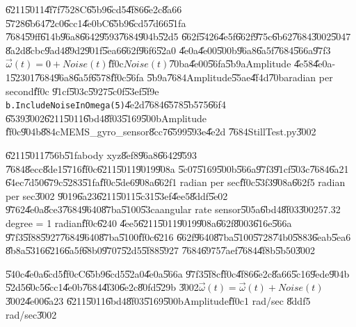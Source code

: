 \U{6211}\U{5011}\U{4f7f}\U{7528}C\U{65b9}\U{6cd5}\U{4f86}\U{6e2c}\U{8a66}%
\U{5728}\U{6b64}\U{72c0}\U{6cc1}\U{4e0b}C\U{65b9}\U{6cd5}\U{7d66}\U{51fa}%
\U{7684}\U{59ff}\U{614b}\U{96a8}\U{6642}\U{9593}\U{7684}\U{904b}\U{52d5}%
\U{662f}\U{5426}\U{4e5f}\U{662f}\U{975c}\U{6b62}\U{7684}\U{3002}\U{5047}%
\U{8a2d}\U{8cbc}\U{9ad4}\U{89d2}\U{901f}\U{5ea6}\U{662f}\U{96f6}\U{52a0}%
\U{4e0a}\U{4e00}\U{500b}\U{96a8}\U{6a5f}\U{7684}\U{566a}\U{97f3}$\vec{\omega}%
(t)=0+Noise(t)$\U{ff0c}$Noise(t)$\U{70ba}\U{4e00}\U{56fa}\U{5b9a}Amplitude%
\U{4e58}\U{4e0a}-1\U{5230}1\U{7684}\U{96a8}\U{6a5f}\U{6578}\U{ff0c}\U{56fa}%
\U{5b9a}\U{7684}Amplitude\U{55ae}\U{4f4d}\U{70ba}radian per second\U{ff0c}%
\U{91cf}\U{503c}\U{5927}\U{5c0f}\U{53ef}\U{5f9e}\newline
\texttt{b.IncludeNoiseInOmega(5)}\U{4e2d}\U{7684}\U{6578}\U{5b57}5\U{66f4}%
\U{6539}\U{3002}\U{6211}\U{5011}\U{6bd4}\U{8f03}\U{5169}\U{500b}Amplitude%
\U{ff0c}\U{904b}\U{884c}MEMS\_gyro\_sensor\U{8cc7}\U{6599}\U{593e}\U{4e2d}%
\U{7684}StillTest.py\U{3002}

\bigskip 

\U{6211}\U{5011}\U{756b}\U{51fa}body xyz\U{8ef8}\U{96a8}\U{6642}\U{9593}%
\U{7684}\U{8ecc}\U{8de1}\U{5716}\U{ff0c}\U{6211}\U{5011}\U{9019}\U{908a}%
\U{5c07}\U{5169}\U{500b}\U{566a}\U{97f3}\U{91cf}\U{503c}\U{7684}\U{6a21}%
\U{64ec}\U{7d50}\U{679c}\U{5283}\U{51fa}\U{ff0c}\U{5de6}\U{908a}\U{662f}1
radian per sec\U{ff0c}\U{53f3}\U{908a}\U{662f}5 radian per sec\U{3002}%
\U{9019}\U{6a23}\U{6211}\U{5011}\U{5c31}\U{53ef}\U{4ee5}\U{8ddf}\U{5e02}%
\U{9762}\U{4e0a}\U{8ce3}\U{7684}\U{9640}\U{87ba}\U{5100}\U{53ca}angular rate
sensor\U{505a}\U{6bd4}\U{8f03}\U{3002}57.32 degree = 1 radian\U{ff0c}\U{6240}%
\U{4ee5}\U{6211}\U{5011}\U{9019}\U{908a}\U{662f}\U{8003}\U{616e}\U{566a}%
\U{97f3}\U{5f88}\U{5927}\U{7684}\U{9640}\U{87ba}\U{5100}\U{ff0c}\U{6216}%
\U{662f}\U{9640}\U{87ba}\U{5100}\U{5728}\U{74b0}\U{5883}\U{6eab}\U{5ea6}%
\U{8b8a}\U{5316}\U{6216}\U{6a5f}\U{68b0}\U{9707}\U{52d5}\U{5f88}\U{5927}%
\U{7684}\U{6975}\U{7aef}\U{7684}\U{4f8b}\U{5b50}\U{3002}

%
\begin{center}

\end{center}%

\U{540c}\U{4e0a}\U{6cd5}\U{ff0c}C\U{65b9}\U{6cd5}\U{52a0}\U{4e0a}\U{566a}%
\U{97f3}\U{5f8c}\U{ff0c}\U{4f86}\U{6e2c}\U{8a66}\U{5c16}\U{9ede}\U{904b}%
\U{52d5}\U{60c5}\U{6cc1}\U{4e0b}\U{7684}\U{4f30}\U{6e2c}\U{80fd}\U{529b}%
\U{3002}$\vec{\omega}(t)=\vec{\omega}(t)+Noise(t)$\U{3002}\U{4e00}\U{6a23}%
\U{6211}\U{5011}\U{6bd4}\U{8f03}\U{5169}\U{500b}Amplitude\U{ff0c}1 rad/sec%
\U{8ddf}5 rad/sec\U{3002}


